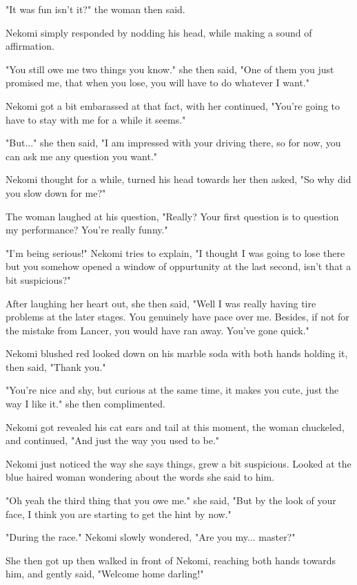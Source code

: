 "It was fun isn't it?" the woman then said.

Nekomi simply responded by nodding his head, while making a sound of affirmation.

"You still owe me two things you know." she then said, "One of them you just promised me, that when you lose, you will have to do whatever I want."

Nekomi got a bit embarassed at that fact, with her continued, "You're going to have to stay with me for a while it seems."

"But..." she then said, "I am impressed with your driving there, so for now, you can ask me any question you want."

Nekomi thought for a while, turned his head towards her then asked, "So why did you slow down for me?"

The woman laughed at his question, "Really? Your first question is to question my performance? You're really funny."

"I'm being serious!" Nekomi tries to explain, "I thought I was going to lose there but you somehow opened a window of oppurtunity at the last second, isn't that a bit suspicious?"

After laughing her heart out, she then said, "Well I was really having tire problems at the later stages. You genuinely have pace over me. Besides, if not for the mistake from Lancer, you would have ran away. You've gone quick."

Nekomi blushed red looked down on his marble soda with both hands holding it, then said, "Thank you."

"You're nice and shy, but curious at the same time, it makes you cute, just the way I like it." she then complimented.

Nekomi got revealed his cat ears and tail at this moment, the woman chuckeled, and continued, "And just the way you used to be."

Nekomi just noticed the way she says things, grew a bit suspicious. Looked at the blue haired woman wondering about the words she said to him.

"Oh yeah the third thing that you owe me." she said, "But by the look of your face, I think you are starting to get the hint by now."

"During the race." Nekomi slowly wondered, "Are you my... master?"

She then got up then walked in front of Nekomi, reaching both hands towards him, and gently said, "Welcome home darling!"


